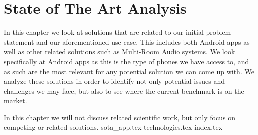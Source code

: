 \chapter{State of The Art Analysis}\label{cha:sota}
In this chapter we look at solutions that are related to our initial problem statement and our aforementioned use case.
This includes both Android apps as well as other related solutions such as Multi-Room Audio systems.
We look specifically at Android apps as this is the type of phones we have access to, and as such are the most relevant for any potential solution we can come up with.
We analyze these solutions in order to identify not only potential issues and challenges we may face, but also to see where the current benchmark is on the market.

In this chapter we will not discuss related scientific work, but only focus on competing or related solutions.
{sota_app.tex}
{technologies.tex}
{index.tex}
